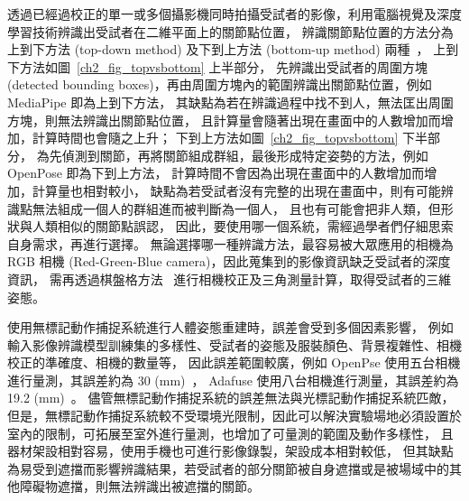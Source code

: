 透過已經過校正的單一或多個攝影機同時拍攝受試者的影像，利用電腦視覺及深度學習技術辨識出受試者在二維平面上的關節點位置，
辨識關節點位置的方法分為上到下方法 (top-down method) 及下到上方法 (bottom-up method) 兩種~\cite{nie2019single}，
上到下方法如圖~\ref{ch2_fig_topvsbottom} 上半部分，
先辨識出受試者的周圍方塊 (detected bounding boxes)，再由周圍方塊內的範圍辨識出關節點位置，例如 MediaPipe 即為上到下方法，
其缺點為若在辨識過程中找不到人，無法匡出周圍方塊，則無法辨識出關節點位置，
且計算量會隨著出現在畫面中的人數增加而增加，計算時間也會隨之上升；
下到上方法如圖~\ref{ch2_fig_topvsbottom} 下半部分，
為先偵測到關節，再將關節組成群組，最後形成特定姿勢的方法，例如 OpenPose 即為下到上方法，
計算時間不會因為出現在畫面中的人數增加而增加，計算量也相對較小，
缺點為若受試者沒有完整的出現在畫面中，則有可能辨識點無法組成一個人的群組進而被判斷為一個人，
且也有可能會把非人類，但形狀與人類相似的關節點誤認，
因此，要使用哪一個系統，需經過學者們仔細思索自身需求，再進行選擇。
無論選擇哪一種辨識方法，最容易被大眾應用的相機為 RGB 相機 (Red-Green-Blue camera)，因此蒐集到的影像資訊缺乏受試者的深度資訊，
需再透過棋盤格方法~\cite{zhang1999flexible} 進行相機校正及三角測量計算，取得受試者的三維姿態。 

使用無標記動作捕捉系統進行人體姿態重建時，誤差會受到多個因素影響，
例如輸入影像辨識模型訓練集的多樣性、受試者的姿態及服裝顏色、背景複雜性、相機校正的準確度、相機的數量等，
因此誤差範圍較廣，例如 OpenPse 使用五台相機進行量測，其誤差約為 30 (mm)~\cite{nakano2020evaluation}，
Adafuse 使用八台相機進行測量，其誤差約為 19.2 (mm)~\cite{zhang2020adafuse}。
儘管無標記動作捕捉系統的誤差無法與光標記動作捕捉系統匹敵，
但是，無標記動作捕捉系統較不受環境光限制，因此可以解決實驗場地必須設置於室內的限制，可拓展至室外進行量測，也增加了可量測的範圍及動作多樣性，
且器材架設相對容易，使用手機也可進行影像錄製，架設成本相對較低，
但其缺點為易受到遮擋而影響辨識結果，若受試者的部分關節被自身遮擋或是被場域中的其他障礙物遮擋，則無法辨識出被遮擋的關節。

